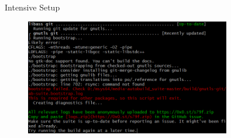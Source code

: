 \documentclass{beamer}
\begin{document}
\begin{frame}{}
  \vspace{-1cm}
  \begin{center}
    \Large Intensive Setup
  \end{center}
  \begin{figure}
    \includegraphics[width=0.8\textwidth]{img/terminal.png}
  \end{figure}
\end{frame}



\end{document}
